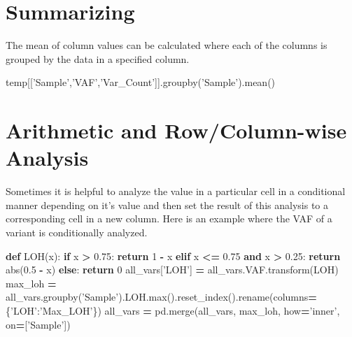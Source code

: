 \documentclass[]{book}
\newenvironment{Shaded}{\begin{snugshade}}{\end{snugshade}}
\newcommand{\KeywordTok}[1]{\textcolor[rgb]{0.13,0.29,0.53}{\textbf{#1}}}
\newcommand{\DecValTok}[1]{\textcolor[rgb]{0.00,0.00,0.81}{#1}}
\newcommand{\FloatTok}[1]{\textcolor[rgb]{0.00,0.00,0.81}{#1}}
\newcommand{\StringTok}[1]{\textcolor[rgb]{0.31,0.60,0.02}{#1}}
\newcommand{\ControlFlowTok}[1]{\textcolor[rgb]{0.13,0.29,0.53}{\textbf{#1}}}
\newcommand{\OperatorTok}[1]{\textcolor[rgb]{0.81,0.36,0.00}{\textbf{#1}}}
\newcommand{\BuiltInTok}[1]{#1}
\newcommand{\NormalTok}[1]{#1}
\begin{document}
\section{Summarizing}\label{summarizing}

The mean of column values can be calculated where each of the columns is
grouped by the data in a specified column.

\begin{Shaded}
\begin{Highlighting}[]
\NormalTok{temp[[}\StringTok{'Sample'}\NormalTok{,}\StringTok{'VAF'}\NormalTok{,}\StringTok{'Var_Count'}\NormalTok{]].groupby(}\StringTok{'Sample'}\NormalTok{).mean()}
\end{Highlighting}
\end{Shaded}

\section{Arithmetic and Row/Column-wise
Analysis}\label{arithmetic-and-rowcolumn-wise-analysis}

Sometimes it is helpful to analyze the value in a particular cell in a
conditional manner depending on it's value and then set the result of
this analysis to a corresponding cell in a new column. Here is an
example where the VAF of a variant is conditionally analyzed.

\begin{Shaded}
\begin{Highlighting}[]
\KeywordTok{def}\NormalTok{ LOH(x):}
    \ControlFlowTok{if}\NormalTok{ x }\OperatorTok{>} \FloatTok{0.75}\NormalTok{: }\ControlFlowTok{return} \DecValTok{1} \OperatorTok{-}\NormalTok{ x}
    \ControlFlowTok{elif}\NormalTok{ x }\OperatorTok{<=} \FloatTok{0.75} \KeywordTok{and}\NormalTok{ x }\OperatorTok{>} \FloatTok{0.25}\NormalTok{: }\ControlFlowTok{return} \BuiltInTok{abs}\NormalTok{(}\FloatTok{0.5} \OperatorTok{-}\NormalTok{ x)}
    \ControlFlowTok{else}\NormalTok{: }\ControlFlowTok{return} \DecValTok{0}
\NormalTok{all_vars[}\StringTok{'LOH'}\NormalTok{] }\OperatorTok{=}\NormalTok{ all_vars.VAF.transform(LOH)}
\NormalTok{max_loh }\OperatorTok{=}\NormalTok{ all_vars.groupby(}\StringTok{'Sample'}\NormalTok{).LOH.}\BuiltInTok{max}\NormalTok{().reset_index().rename(columns}\OperatorTok{=}\NormalTok{\{}\StringTok{'LOH'}\NormalTok{:}\StringTok{'Max_LOH'}\NormalTok{\})}
\NormalTok{all_vars }\OperatorTok{=}\NormalTok{ pd.merge(all_vars, max_loh, how}\OperatorTok{=}\StringTok{'inner'}\NormalTok{, on}\OperatorTok{=}\NormalTok{[}\StringTok{'Sample'}\NormalTok{])}
\end{Highlighting}
\end{Shaded}
\end{document}

